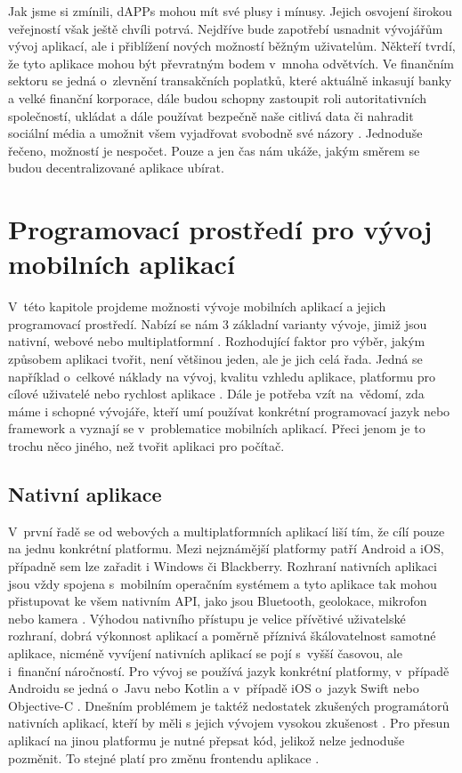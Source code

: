 Jak jsme si zmínili, dAPPs mohou mít své plusy i mínusy. Jejich osvojení širokou veřejností však ještě chvíli potrvá. Nejdříve bude zapotřebí usnadnit vývojářům vývoj aplikací, ale i přiblížení nových možností běžným uživatelům. Někteří tvrdí, že tyto aplikace mohou být převratným bodem v~mnoha odvětvích. Ve finančním sektoru se jedná o~zlevnění transakčních poplatků, které aktuálně inkasují banky a velké finanční korporace, dále budou schopny zastoupit roli autoritativních společností, ukládat a dále používat bezpečně naše citlivá data či nahradit sociální média a umožnit všem vyjadřovat svobodně své názory \cite{DAPPS2}. Jednoduše řečeno, možností je nespočet. Pouze a jen čas nám ukáže, jakým směrem se budou decentralizované aplikace ubírat.

\chapter{Programovací prostředí pro vývoj mobilních aplikací}
\label{chapter:3}
V~této kapitole projdeme možnosti vývoje mobilních aplikací a jejich programovací prostředí. Nabízí se nám 3 základní varianty vývoje, jimiž jsou nativní, webové nebo multiplatformní \cite{mobiles}. Rozhodující faktor pro výběr, jakým způsobem aplikaci tvořit, není většinou jeden, ale je jich celá řada. Jedná se například o~celkové náklady na vývoj, kvalitu vzhledu aplikace, platformu pro cílové uživatelé nebo rychlost aplikace \cite{AppsFrameworks}. Dále je potřeba vzít na~vědomí, zda máme i schopné vývojáře, kteří umí používat konkrétní programovací jazyk nebo framework a vyznají se v~problematice mobilních aplikací. Přeci jenom je to trochu něco jiného, než tvořit aplikaci pro počítač.

\section{Nativní aplikace}
V~první řadě se od webových a multiplatformních aplikací liší tím, že cílí pouze na jednu konkrétní platformu. Mezi nejznámější platformy patří Android a iOS, případně sem lze zařadit i  Windows či Blackberry. Rozhraní nativních aplikaci jsou vždy spojena s~mobilním operačním systémem a tyto aplikace tak mohou přistupovat ke všem nativním API, jako jsou Bluetooth, geolokace, mikrofon nebo kamera \cite{mobiles}. Výhodou nativního přístupu je velice přívětivé uživatelské rozhraní, dobrá výkonnost aplikací a poměrně příznivá škálovatelnost samotné aplikace, nicméně vyvíjení nativních aplikací se pojí s~vyšší časovou, ale i~finanční náročností. Pro vývoj se používá jazyk konkrétní platformy, v~případě Androidu se jedná o~Javu nebo Kotlin a v~případě iOS o~jazyk Swift nebo Objective-C \cite{mobilesuptech}. Dnešním problémem je taktéž nedostatek zkušených programátorů nativních aplikací, kteří by měli s jejich vývojem vysokou zkušenost \cite{mobilesamazon}. Pro přesun aplikací na jinou platformu je nutné přepsat kód, jelikož nelze jednoduše pozměnit. To stejné platí pro změnu frontendu aplikace \cite{mobilesibm}.

